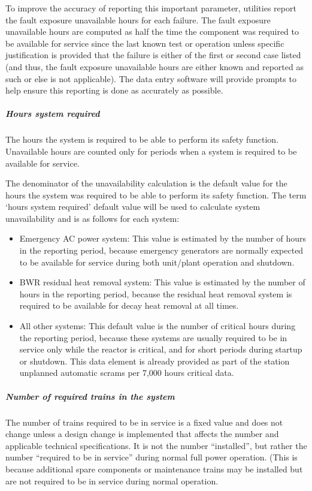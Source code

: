 To improve the accuracy of reporting this important parameter,
utilities report the fault exposure unavailable hours for each
failure. The fault exposure unavailable hours are computed as half the
time the component was required to be available for service since the
last known test or operation unless specific justification is provided
that the failure is either of the first or second case listed (and
thus, the fault exposure unavailable hours are either known and
reported as such or else is not applicable). The data entry software
will provide prompts to help ensure this reporting is done as
accurately as possible.

\subparagraph{Hours system required}

The hours the system is required to be able to perform its safety
function. Unavailable hours are counted only for periods when a system
is required to be available for service.

The denominator of the unavailability calculation is the default value
for the hours the system was required to be able to perform its safety
function. The term ‘hours system required’ default value will be used
to calculate system unavailability and is as follows for each system:
\begin{itemize}
\item Emergency AC power system:  This value is estimated by the number of hours in the reporting period, because emergency generators are normally expected to be available for service during both unit/plant operation and shutdown.
\item BWR residual heat removal system:  This value is estimated by the number of hours in the reporting period, because the residual heat removal system is required to be available for decay heat removal at all times.
\item All other systems:  This default value is the number of critical
  hours during the reporting period, because these systems are usually
  required to be in service only while the reactor is critical, and
  for short periods during startup or shutdown. This data element is
  already provided as part of the station unplanned automatic scrams
  per 7,000 hours critical data.
\end{itemize}

\subparagraph{Number of required trains in the system}

The number of trains required to be in service is a fixed value and
does not change unless a design change is implemented that affects the
number and applicable technical specifications.  It is not the number
“installed”, but rather the number “required to be in service” during
normal full power operation.  (This is because additional spare
components or maintenance trains may be installed but are not required
to be in service during normal operation.

